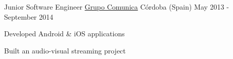 \begin{cventries}

  \cventry
    {Junior Software Engineer} %
    {\href{http://www.grupocomunica.com/}{Grupo Comunica}} %
    {Córdoba (Spain)} %
    {May 2013 - September 2014} %
    {
      \begin{cvitems}%
        \item {Developed Android \& iOS applications}
        \item {Built an audio-visual streaming project}
      \end{cvitems}
    }

\end{cventries}
